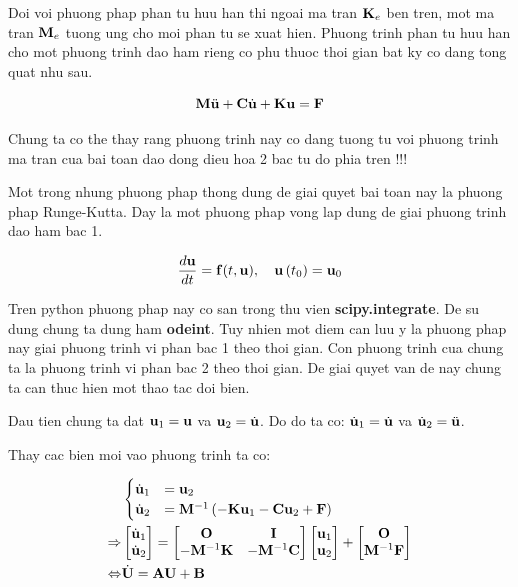 Doi voi phuong phap phan tu huu han thi ngoai ma tran ${\bf K}_e$ ben tren, mot ma tran ${\bf M}_e$ tuong ung cho moi phan tu se xuat hien. Phuong trinh phan tu huu han cho mot phuong trinh dao ham rieng co phu thuoc thoi gian bat ky co dang tong quat nhu sau.

\begin{equation}\label{eq_PTHH_general}
    {\bf M}\ddot{\bf u} + {\bf C}\dot{\bf u} + {\bf K}{\bf u} = {\bf F}
\end{equation}

Chung ta co the thay rang phuong trinh nay co dang tuong tu voi phuong trinh ma tran cua bai toan dao dong dieu hoa 2 bac tu do phia tren !!!

Mot trong nhung phuong phap thong dung de giai quyet bai toan nay la phuong phap Runge-Kutta. Day la mot phuong phap vong lap dung de giai phuong trinh dao ham bac 1. 

\begin{equation}
    \frac{d {\bf u}}{d t}={\bf f}(t,{\bf u}) ,\quad {\bf u}\left(t_0\right)={\bf u}_0
\end{equation}

Tren python phuong phap nay co san trong thu vien \textbf{scipy.integrate}. De su dung chung ta dung ham \textbf{odeint}. Tuy nhien mot diem can luu y la phuong phap nay giai phuong trinh vi phan bac 1 theo thoi gian. Con phuong trinh cua chung ta la phuong trinh vi phan bac 2 theo thoi gian. De giai quyet van de nay chung ta can thuc hien mot thao tac doi bien. 

Dau tien chung ta dat ${\bf u}_1 = {\bf u}$ va ${\bf u}_2 = \dot{\bf u}$. Do do ta co: $\dot{\bf u}_1 = \dot{\bf u}$ va $\dot{\bf u}_2 = \ddot{\bf u}$.

Thay cac bien moi vao phuong trinh ta co:

\begin{equation}
    \begin{aligned}
    &\begin{cases}
        \dot{\bf u}_1 &= {\bf u}_2 \\
        \dot{\bf u}_2 &= {\bf M}^{-1}\left(-{\bf K}{\bf u}_1-{\bf C}{\bf u}_2 + {\bf F}\right)
    \end{cases} \\
    \Rightarrow &\begin{bmatrix}
        \dot{\bf u}_1 \\ \dot{\bf u}_2
    \end{bmatrix} = \begin{bmatrix}
        {\bf O} & {\bf I} \\
        -{\bf M}^{-1}{\bf K} & -{\bf M}^{-1}{\bf C}
    \end{bmatrix}\begin{bmatrix}
        {\bf u}_1 \\ {\bf u}_2
    \end{bmatrix} + \begin{bmatrix}
        {\bf O} \\ {\bf M}^{-1}{\bf F}
    \end{bmatrix} \\
    \Leftrightarrow & \dot{\bf U} = {\bf A} {\bf U} + {\bf B}
    \end{aligned}
\end{equation}

